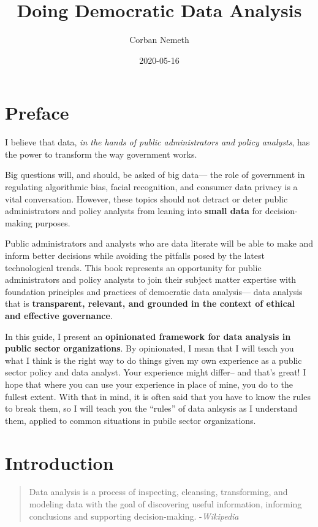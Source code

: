 \documentclass[]{book}
\title{Doing Democratic Data Analysis}
\author{Corban Nemeth}
\date{2020-05-16}
\begin{document}
\maketitle

{
\setcounter{tocdepth}{1}
\tableofcontents
}
\hypertarget{preface}{%
\chapter*{Preface}\label{preface}}

I believe that data, \emph{in the hands of public administrators and policy analysts}, has the power to transform the way government works.

Big questions will, and should, be asked of big data--- the role of government in regulating algorithmic bias, facial recognition, and consumer data privacy is a vital conversation. However, these topics should not detract or deter public administrators and policy analysts from leaning into \textbf{small data} for decision-making purposes.

Public administrators and analysts who are data literate will be able to make and inform better decisions while avoiding the pitfalls posed by the latest technological trends. This book represents an opportunity for public administrators and policy analysts to join their subject matter expertise with foundation principles and practices of democratic data analysis--- data analysis that is \textbf{transparent, relevant, and grounded in the context of ethical and effective governance}.

In this guide, I present an \textbf{opinionated framework for data analysis in public sector organizations}. By opinionated, I mean that I will teach you what I think is the right way to do things given my own experience as a public sector policy and data analyst. Your experience might differ-- and that's great! I hope that where you can use your experience in place of mine, you do to the fullest extent. With that in mind, it is often said that you have to know the rules to break them, so I will teach you the ``rules'' of data anlsysis as I understand them, applied to common situations in pubilc sector organizations.

\hypertarget{intro}{%
\chapter{Introduction}\label{intro}}

\begin{quote}
Data analysis is a process of inspecting, cleansing, transforming, and modeling data with the goal of discovering useful information, informing conclusions and supporting decision-making. -\emph{Wikipedia}
\end{quote}
\end{document}
